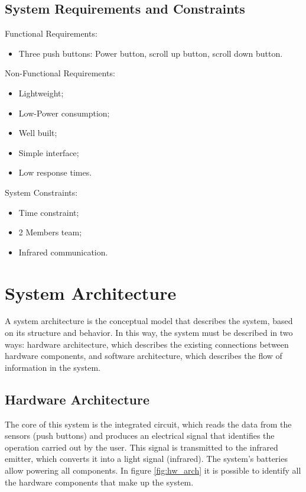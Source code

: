 \documentclass[12pt, letterpaper]{report}
\begin{document}
\subsection{System Requirements and Constraints}

Functional Requirements:

\begin{itemize}
	\item Three push buttons: Power button, scroll up button, scroll down button.\\
\end{itemize}

Non-Functional Requirements:
\begin{itemize}
	\item Lightweight;
	\item Low-Power consumption;
	\item Well built;
	\item Simple interface;
	\item Low response times.\\
\end{itemize}

System Constraints:
\begin{itemize}
	\item Time constraint;
	\item 2 Members team;
	\item Infrared communication.\\
\end{itemize}
\section{System Architecture}
A system architecture is the conceptual model that describes the system, based on its structure and behavior. In this way, the system must be described in two ways: hardware architecture, which describes the existing connections between hardware components, and software architecture, which describes the flow of information in the system.

\subsection{Hardware Architecture}
The core of this system is the integrated circuit, which reads the data from the sensors (push buttons) and produces an electrical signal that identifies the operation carried out by the user. This signal is transmitted to the infrared emitter, which converts it into a light signal (infrared). The system's batteries allow powering all components. In figure \ref{fig:hw_arch} it is possible to identify all the hardware components that make up the system. 
\end{document}
